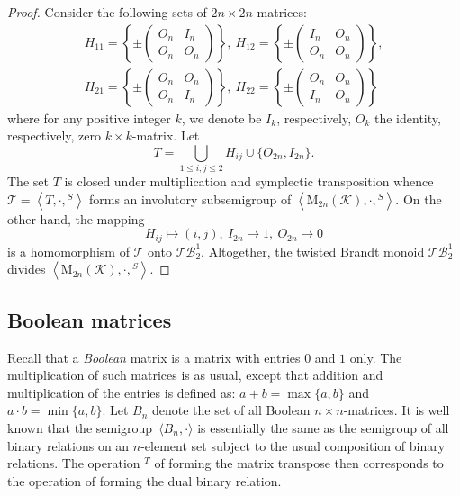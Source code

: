 \documentclass[11pt,reqno]{amsart}
\numberwithin{equation}{section}
\theoremstyle{remark}
\def\sm{semi\-group}
\begin{document}
\begin{proof} Consider the following sets of $2n\times 2n$-matrices:
\begin{gather*}
H_{11}=\left\{\pm \begin{pmatrix}O_n & I_n \\ O_n&O_n
\end{pmatrix}\right\},\
H_{12}=\left\{\pm \begin{pmatrix}I_n & O_n \\ O_n&O_n \end{pmatrix}\right\},\\
H_{21}=\left\{\pm \begin{pmatrix}O_n & O_n \\ O_n&I_n
\end{pmatrix}\right\},\
H_{22}=\left\{\pm \begin{pmatrix}O_n & O_n \\ I_n&O_n
\end{pmatrix}\right\}
\end{gather*}
where for any positive integer $k$, we denote be $I_k$,
respectively, $O_k$ the identity, respectively, zero $k\times
k$-matrix. Let
$$T=\bigcup_{1\le i,j\le 2}H_{ij}\cup \{O_{2n}, I_{2n}\}.$$
The set $T$ is closed under multiplication and symplectic
transposition whence $\mathcal{T}=\left<T,\cdot,{}^S\right>$ forms
an involutory subsemigroup of
$\left<\mathrm{M}_{2n}(\mathcal{K}),\cdot,{}^S\right>$. On the
other hand, the mapping
$$H_{ij}\mapsto (i,j),\ I_{2n}\mapsto 1,\ O_{2n}
\mapsto 0$$ is a homomorphism of $\mathcal{T}$ onto
$\mathcal{TB}^1_2$. Altogether, the twisted Brandt monoid
$\mathcal{TB}^1_2$ divides
$\left<\mathrm{M}_{2n}(\mathcal{K}),\cdot,{}^S\right>$.
\end{proof}
\subsection{Boolean matrices}
Recall that a \emph{Boolean} matrix is a matrix with entries $0$
and $1$ only. The multiplication of such matrices is as usual,
except that addition and multiplication of the entries is defined
as: $a+b=\max\{a,b\}$ and $a\cdot b=\min\{a,b\}$. Let $B_n$ denote
the set of all Boolean $n\times n$-matrices. It is well known that
the \sm\ $\langle B_n,\cdot\rangle$ is essentially the same as the
semigroup of all binary relations on an $n$-element set subject to
the usual composition of binary relations. The operation ${}^T$ of
forming the matrix transpose then corresponds to the operation of
forming the dual binary relation.
\end{document}
